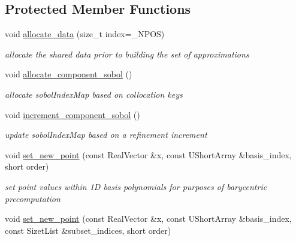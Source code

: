 \subsection*{Protected Member Functions}
\begin{DoxyCompactItemize}
\item 
void \hyperlink{classPecos_1_1SharedNodalInterpPolyApproxData_af8c5dd497976d775d2c600c9950f6b2e}{allocate\+\_\+data} (size\+\_\+t index=\+\_\+\+N\+P\+OS)\label{classPecos_1_1SharedNodalInterpPolyApproxData_af8c5dd497976d775d2c600c9950f6b2e}

\begin{DoxyCompactList}\small\item\em allocate the shared data prior to building the set of approximations \end{DoxyCompactList}\item 
void \hyperlink{classPecos_1_1SharedNodalInterpPolyApproxData_a489e05c9d1bc07d7120ce3dfc9a7e66a}{allocate\+\_\+component\+\_\+sobol} ()\label{classPecos_1_1SharedNodalInterpPolyApproxData_a489e05c9d1bc07d7120ce3dfc9a7e66a}

\begin{DoxyCompactList}\small\item\em allocate sobol\+Index\+Map based on collocation keys \end{DoxyCompactList}\item 
void \hyperlink{classPecos_1_1SharedNodalInterpPolyApproxData_ae66f3349bfdbb48a266dd09760f4f023}{increment\+\_\+component\+\_\+sobol} ()\label{classPecos_1_1SharedNodalInterpPolyApproxData_ae66f3349bfdbb48a266dd09760f4f023}

\begin{DoxyCompactList}\small\item\em update sobol\+Index\+Map based on a refinement increment \end{DoxyCompactList}\item 
void \hyperlink{classPecos_1_1SharedNodalInterpPolyApproxData_a66e56a4893ad9caf1f6be673c3d77128}{set\+\_\+new\+\_\+point} (const Real\+Vector \&x, const U\+Short\+Array \&basis\+\_\+index, short order)\label{classPecos_1_1SharedNodalInterpPolyApproxData_a66e56a4893ad9caf1f6be673c3d77128}

\begin{DoxyCompactList}\small\item\em set point values within 1D basis polynomials for purposes of barycentric precomputation \end{DoxyCompactList}\item 
void \hyperlink{classPecos_1_1SharedNodalInterpPolyApproxData_a4de6e6ae6cf7f728ab4f05773015ccaa}{set\+\_\+new\+\_\+point} (const Real\+Vector \&x, const U\+Short\+Array \&basis\+\_\+index, const Sizet\+List \&subset\+\_\+indices, short order)\label{classPecos_1_1SharedNodalInterpPolyApproxData_a4de6e6ae6cf7f728ab4f05773015ccaa}


\end{DoxyCompactItemize}

